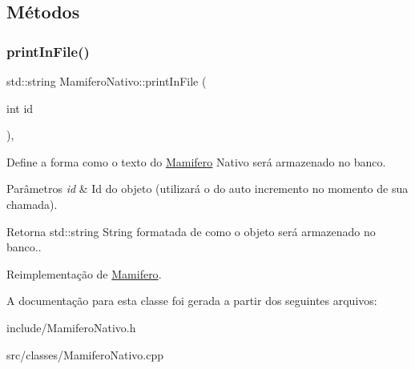 \subsection{Métodos}
\mbox{\label{classMamiferoNativo_ae2f2b00cb6720cea2780ebef78be52ea}} 
\subsubsection{\texorpdfstring{print\+In\+File()}{printInFile()}}
{\footnotesize\ttfamily std\+::string Mamifero\+Nativo\+::print\+In\+File (\begin{DoxyParamCaption}\item[{int}]{id }\end{DoxyParamCaption})\hspace{0.3cm}{\ttfamily [protected]}, {\ttfamily [virtual]}}



Define a forma como o texto do \hyperlink{classMamifero}{Mamifero} Nativo será armazenado no banco. 


\begin{DoxyParams}{Parâmetros}
{\em id} & Id do objeto (utilizará o do auto incremento no momento de sua chamada). \\
\hline
\end{DoxyParams}
\begin{DoxyReturn}{Retorna}
std\+::string String formatada de como o objeto será armazenado no banco.. 
\end{DoxyReturn}


Reimplementação de \hyperlink{classMamifero_a88e6c2efe9180611486f82d4dbf308ba}{Mamifero}.



A documentação para esta classe foi gerada a partir dos seguintes arquivos\+:\begin{DoxyCompactItemize}
\item 
include/Mamifero\+Nativo.\+h\item 
src/classes/Mamifero\+Nativo.\+cpp\end{DoxyCompactItemize}
